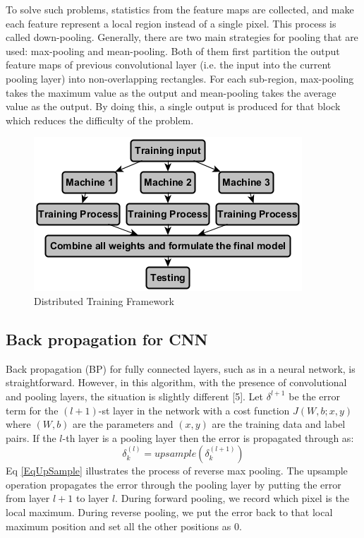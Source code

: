 To solve such problems, statistics from the feature maps are collected, and make each feature represent a local region instead of a single pixel. This process is called down-pooling. Generally, there are two main strategies for pooling that are used: max-pooling and mean-pooling. Both of them first partition the output feature maps of previous convolutional layer (i.e. the input into the current pooling layer) into non-overlapping rectangles. For each sub-region, max-pooling takes the maximum value as the output and mean-pooling takes the average value as the output. By doing this, a single output is produced for that block which reduces the difficulty of the problem.
\begin {figure}[t]
\centering
\includegraphics[width=0.90\columnwidth]{Fig8DistTrFrWk.png}
\caption{Distributed Training Framework}
\label{Distributed Training Framework}
\end {figure}
\subsection{Back propagation for CNN}
Back propagation (BP) for fully connected layers, such as in a neural network, is straightforward. However, in this algorithm, with the presence of convolutional and pooling layers, the situation is slightly different [5]. Let $\delta^{l+1}$ be the error term for the $(l+1)$-st layer in the network with a cost function $J(W,b;x,y)$ where $(W,b)$ are the parameters and $(x,y)$ are the training data and label pairs. If the $l$-th layer is a pooling layer then the error is propagated through as:
\begin{equation}
\delta_k^{(l)}=upsample(\delta_k^{(l+1)})
\label{EqUpSample}
\end{equation}
Eq \eqref{EqUpSample} illustrates the process of reverse max pooling. The upsample operation propagates the error through the pooling layer by putting the error from layer $l+1$ to layer $l$. During forward pooling, we record which pixel is the local maximum. During reverse pooling, we put the error back to that local maximum position and set all the other positions as 0.

